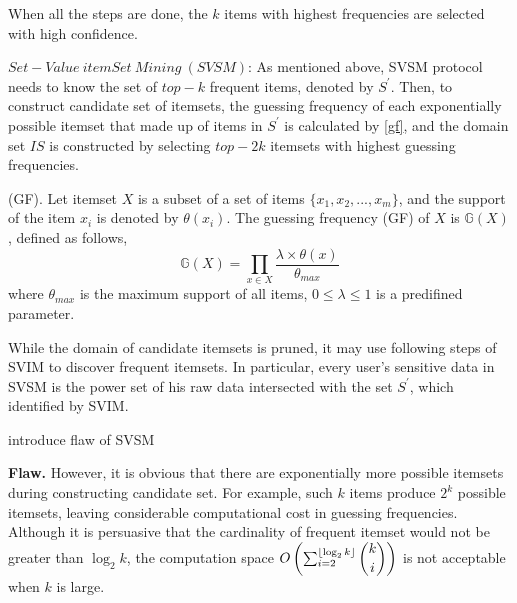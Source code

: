 \documentclass[conference]{IEEEtran}
\begin{document}
When all the steps are done, the $k$ items with highest frequencies are selected with high confidence.


$Set-Value\ itemSet\ Mining\ (SVSM)$: As mentioned above, SVSM protocol needs to know the set of $top-k$ frequent items, denoted by $S^{\prime}$. Then, to construct candidate set of itemsets, the guessing frequency of each  exponentially possible itemset that made up of items in $S^{\prime}$ is calculated by \eqref{gf}, and the domain set $IS$ is constructed by selecting $top-2k$ itemsets with highest guessing frequencies.

\begin{Definition}
(GF). Let itemset $X$ is a subset of a set of items $\{{x_1,x_2,...,x_m} \}$, and the support of the item $x_i$ is denoted by $\theta(x_i)$. The guessing frequency (GF) of $X$ is $\mathbb{G}(X)$, defined as follows,\\
\begin{equation}
\mathbb{G}(X) = \prod_{x \in X} \frac{\lambda \times \theta(x)}{\theta_{max}} \label{gf}
\end{equation}
where $\theta_{max}$ is the maximum support of all items, $0 \leq \lambda \leq 1$ is a predifined parameter.

\end{Definition}

While the domain of candidate itemsets is pruned, it may use following steps of SVIM to discover frequent itemsets. In particular, every user's sensitive data in SVSM is the power set of his raw data intersected with the set $S^{\prime}$, which identified by SVIM.

{\color{red}introduce flaw of SVSM}

\textbf{Flaw.} However, it is obvious that there are exponentially more possible itemsets during constructing candidate set. For example, such $k$ items produce $2^{k}$ possible itemsets, leaving considerable computational cost in guessing frequencies. Although it is persuasive that the cardinality of frequent itemset would not be greater than $\log_{2} k$, the computation space $O\left(\sum_{i=2}^{\lfloor \log_{2}k \rfloor} \dbinom{k}{i} \right)$ is not acceptable when $k$ is large.
\end{document}
